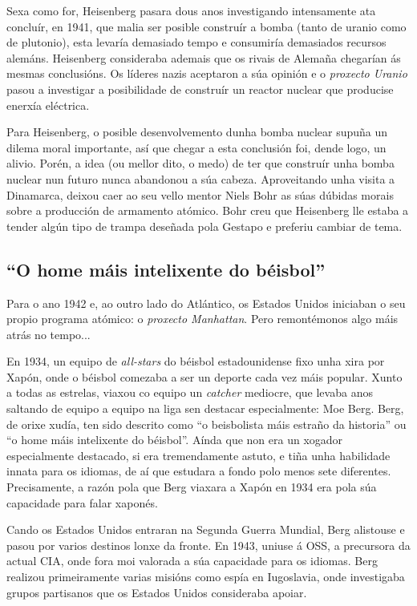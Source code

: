 \begin{refsection}
\begin{multicols}{2}
Sexa como for, Heisenberg pasara dous anos investigando intensamente ata
concluír, en 1941, que malia ser posible construír a bomba (tanto de uranio
como de plutonio), esta levaría demasiado tempo e consumiría demasiados
recursos alemáns. Heisenberg consideraba ademais que os rivais de Alemaña
chegarían ás mesmas conclusións. Os líderes nazis aceptaron a súa opinión e o
\textit{proxecto Uranio} pasou a investigar a posibilidade de construír un
reactor nuclear que producise enerxía eléctrica.

Para Heisenberg, o posible desenvolvemento dunha bomba nuclear supuña un dilema
moral importante, así que chegar a esta conclusión foi, dende logo, un alivio.
Porén, a idea (ou mellor dito, o medo) de ter que construír unha bomba nuclear
nun futuro nunca abandonou a súa cabeza. Aproveitando unha visita a Dinamarca,
deixou caer ao seu vello mentor Niels Bohr as súas dúbidas morais sobre a
producción de armamento atómico. Bohr creu que Heisenberg lle estaba a tender
algún tipo de trampa deseñada pola Gestapo e preferiu cambiar de tema.

\subsection*{``O home máis intelixente do béisbol''}

Para o ano 1942 e, ao outro lado do Atlántico, os Estados Unidos iniciaban o
seu propio programa atómico: o \textit{proxecto Manhattan}. Pero remontémonos
algo máis atrás no tempo...

En 1934, un equipo de \textit{all-stars} do béisbol estadounidense fixo unha
xira por Xapón, onde o béisbol comezaba a ser un deporte cada vez máis popular.
Xunto a todas as estrelas, viaxou co equipo un \textit{catcher} mediocre, que
levaba anos saltando de equipo a equipo na liga sen destacar especialmente: Moe
Berg. Berg, de orixe xudía, ten sido descrito como ``o beisbolista máis estraño
da historia'' ou ``o home máis intelixente do béisbol''. Aínda que non era un
xogador especialmente destacado, si era tremendamente astuto, e tiña unha
habilidade innata para os idiomas, de aí que estudara a fondo polo menos sete
diferentes. Precisamente, a razón pola que Berg viaxara a Xapón en 1934 era
pola súa capacidade para falar xaponés.

Cando os Estados Unidos entraran na Segunda Guerra Mundial, Berg alistouse e
pasou por varios destinos lonxe da fronte. En 1943, uniuse á OSS, a precursora
da actual CIA, onde fora moi valorada a súa capacidade para os idiomas. Berg
realizou primeiramente varias misións como espía en Iugoslavia, onde
investigaba grupos partisanos que os Estados Unidos consideraba apoiar.


\end{multicols}
\end{refsection}
